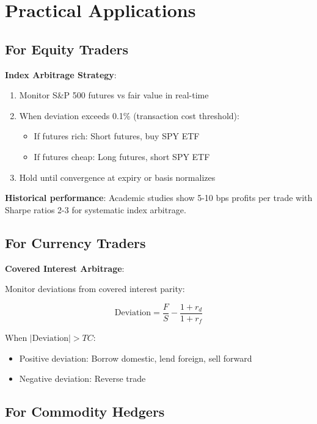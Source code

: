 \documentclass[12pt,a4paper]{article}
\begin{document}
\section{Practical Applications}

\subsection{For Equity Traders}

\textbf{Index Arbitrage Strategy}:

\begin{enumerate}
    \item Monitor S\&P 500 futures vs fair value in real-time
    \item When deviation exceeds 0.1\% (transaction cost threshold):
    \begin{itemize}
        \item If futures rich: Short futures, buy SPY ETF
        \item If futures cheap: Long futures, short SPY ETF
    \end{itemize}
    \item Hold until convergence at expiry or basis normalizes
\end{enumerate}

\textbf{Historical performance}: Academic studies show 5-10 bps profits per trade with Sharpe ratios 2-3 for systematic index arbitrage.

\subsection{For Currency Traders}

\textbf{Covered Interest Arbitrage}:

Monitor deviations from covered interest parity:

\begin{equation}
\text{Deviation} = \frac{F}{S} - \frac{1 + r_d}{1 + r_f}
\end{equation}

When $|\text{Deviation}| > TC$:
\begin{itemize}
    \item Positive deviation: Borrow domestic, lend foreign, sell forward
    \item Negative deviation: Reverse trade
\end{itemize}

\subsection{For Commodity Hedgers}
\end{document}
